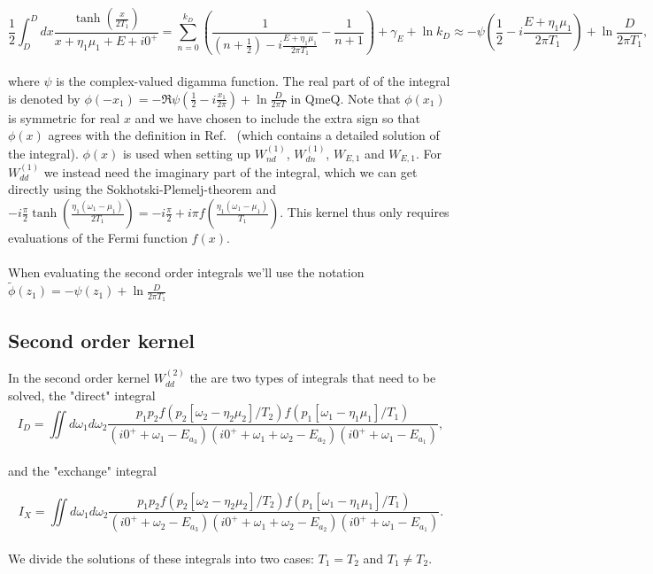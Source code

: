\documentclass{article}
\begin{document}
\begin{equation}
   \frac{1}{2}\int_D^Ddx \frac{\tanh\left (\frac{x}{2T_1}\right )}{x + \eta_1\mu_1 + E + i0^+}= \sum_{n=0}^{k_D} \left ( \frac{1}{\left ( n+\frac{1}{2}\right ) - i\frac{E+\eta_1\mu_1}{2\pi T_1}}-\frac{1}{n+1}\right ) + \gamma_E +\ln k_D \approx -\psi\left ( \frac{1}{2}-i\frac{E+\eta_1\mu_1}{2\pi T_1}\right )  + \ln \frac{D}{2\pi T_1},
\end{equation}
\\
where $\psi$ is the complex-valued digamma function. The real part of of the integral is denoted by $\phi(-x_1) = -\Re \psi\left ( \frac{1}{2}-i\frac{x_1}{2\pi}\right )  + \ln \frac{D}{2\pi T}$ in QmeQ. Note that $\phi(x_1)$ is symmetric for real $x$ and we have chosen to include the extra sign so that $\phi(x)$ agrees with the definition in Ref.~\cite{leijnse2008kinetic} (which contains a detailed solution of the integral). $\phi(x)$ is used when setting up $W_{nd}^{(1)}$, $W_{dn}^{(1)}$, $W_{E,1}$ and $W_{E,1}$. For $W_{dd}^{(1)}$ we instead need the imaginary part of the integral, which we can get directly using the Sokhotski-Plemelj-theorem and $-i\frac{\pi}{2}\tanh\left ( \frac{\eta_1(\omega_1-\mu_1)}{2T_1}\right )=-i\frac{\pi}{2}+i\pi f\left(\frac{\eta_1(\omega_1-\mu_1)}{T_1}\right )$. This kernel thus only requires evaluations of the Fermi function $f(x)$.
\\
\\
When evaluating the second order integrals we'll use the notation $\tilde{\phi}(z_1) = -\psi(z_1) + \ln \frac{D}{2\pi T_1}$
\subsection{Second order kernel}

In the second order kernel $W_{dd}^{(2)}$ the are two types of integrals that need to be solved, the "direct" integral
\\
\begin{equation}
    I_D = \iint d\omega_1 d\omega_2 \frac{p_1p_2f(p_2[\omega_2-\eta_2\mu_2]/T_2)f(p_1[\omega_1-\eta_1\mu_1]/T_1)}{(i0^++\omega_1-E_{a_3})(i0^++\omega_1 + \omega_2-E_{a_2})(i0^++\omega_1-E_{a_1})},
\end{equation}
\\
and the "exchange" integral 

\begin{equation}
    I_X = \iint d\omega_1d\omega_2 \frac{p_1p_2f(p_2[\omega_2-\eta_2\mu_2]/T_2)f(p_1[\omega_1-\eta_1\mu_1]/T_1)}{(i0^++\omega_2-E_{a_3})(i0^++\omega_1 + \omega_2-E_{a_2})(i0^++\omega_1-E_{a_1})}.
\end{equation}
\\
We divide the solutions of these integrals into two cases: $T_1=T_2$ and $T_1\ne T_2$.
\end{document}
